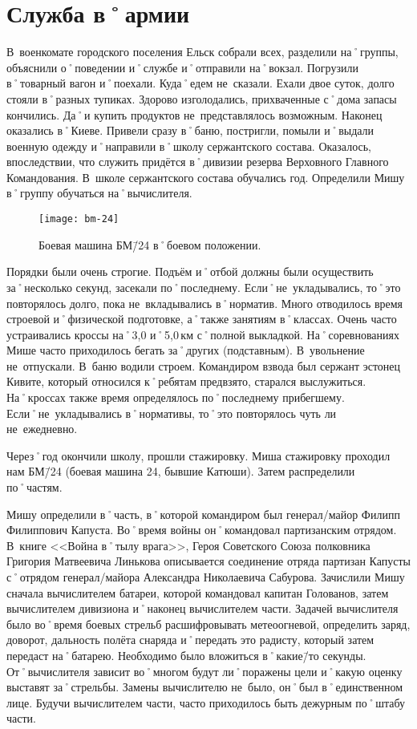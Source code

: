 ﻿\chapter{Служба в˚армии}
В~военкомате городского поселения Ельск собрали всех, разделили на˚группы, объяснили о˚поведении и˚службе и˚отправили на˚вокзал. Погрузили в˚товарный вагон и˚поехали. Куда˚едем не~сказали. Ехали двое суток, долго стояли в˚разных тупиках. Здорово изголодались, прихваченные с˚дома запасы кончились. Да˚и купить продуктов не~представлялось возможным. Наконец оказались в˚Киеве. Привели сразу в˚баню, постригли, помыли и˚выдали военную одежду и˚направили в˚школу сержантского состава. Оказалось, впоследствии, что служить придётся в˚дивизии резерва Верховного Главного Командования. В~школе сержантского состава обучались год. Определили Мишу в˚группу обучаться на˚вычислителя.

\begin{wrapfigure}{O}{.4\textwidth}
\centering
\texttt{[image: bm-24]}
\caption[Боевая машина БМ\=/24 в˚боевом положении.]{Боевая машина БМ\=/24 в˚боевом положении\footnotemark.}
\label{fig:bm-24}
\end{wrapfigure}

Порядки были очень строгие. Подъём и˚отбой должны были осуществить за˚несколько секунд, засекали по˚последнему. Если˚не~укладывались, то˚это повторялось долго, пока не~вкладывались в˚норматив. Много отводилось время строевой и˚физической подготовке, а˚также занятиям в˚классах. Очень часто устраивались кроссы на˚3,0 и˚5,0\,км с˚полной выкладкой. На˚соревнованиях Мише часто приходилось бегать за˚других (подставным). В~увольнение не~отпускали. В~баню водили строем. Командиром взвода был сержант эстонец Кивите, который относился к˚ребятам предвзято, старался выслужиться. На˚кроссах также время определялось по˚последнему прибегшему. Если˚не~укладывались в˚нормативы, то˚это повторялось чуть ли не~ежедневно. 

Через˚год окончили школу, прошли стажировку. Миша стажировку проходил нам БМ\=/24 (боевая машина 24, бывшие Катюши). Затем распределили по˚частям. 

Мишу определили в˚часть, в˚которой командиром был генерал\-/майор Филипп Филиппович Капуста. Во˚время войны он˚командовал партизанским отрядом. В~книге <<Война в˚тылу врага>>, Героя Советского Союза полковника Григория Матвеевича Линькова описывается соединение отряда партизан Капусты с˚отрядом генерал\-/майора Александра Николаевича Сабурова. Зачислили Мишу сначала вычислителем батареи, которой командовал капитан Голованов, затем вычислителем дивизиона и˚наконец вычислителем части. Задачей вычислителя было во˚время боевых стрельб расшифровывать метеоогневой, определить заряд, доворот, дальность полёта снаряда и˚передать это радисту, который затем передаст на˚батарею. Необходимо было вложиться в˚какие\=/то секунды. От˚вычислителя зависит во˚многом будут ли˚поражены цели и˚какую оценку выставят за˚стрельбы. Замены вычислителю не~было, он˚был в˚единственном лице. Будучи вычислителем части, часто приходилось быть дежурным по˚штабу части. 

